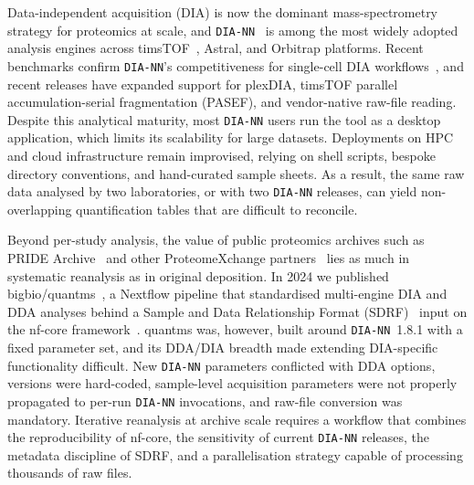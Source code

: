 Data-independent acquisition (DIA) is now the dominant mass-spectrometry strategy for proteomics at scale, and \texttt{DIA-NN}~\cite{demichev2020} is among the most widely adopted analysis engines across timsTOF~\cite{brunner2022,meier2020}, Astral, and Orbitrap platforms.
Recent benchmarks confirm \texttt{DIA-NN}'s competitiveness for single-cell DIA workflows~\cite{wang2025}, and recent releases have expanded support for plexDIA, timsTOF parallel accumulation-serial fragmentation (PASEF), and vendor-native raw-file reading.
Despite this analytical maturity, most \texttt{DIA-NN} users run the tool as a desktop application, which limits its scalability for large datasets. Deployments on HPC and cloud infrastructure remain improvised, relying on shell scripts, bespoke directory conventions, and hand-curated sample sheets. As a result, the same raw data analysed by two laboratories, or with two \texttt{DIA-NN} releases, can yield non-overlapping quantification tables that are difficult to reconcile.

Beyond per-study analysis, the value of public proteomics archives such as PRIDE Archive~\cite{perezriverol2025pride} and other ProteomeXchange partners~\cite{deutsch2026proteomexchange} lies as much in systematic reanalysis as in original deposition. In 2024 we published bigbio/quantms~\cite{dai2024quantms}, a Nextflow pipeline that standardised multi-engine DIA and DDA analyses behind a Sample and Data Relationship Format (SDRF)~\cite{dai2021sdrf} input on the nf-core framework~\cite{ewels2020nfcore}. quantms was, however, built around \texttt{DIA-NN}~1.8.1 with a fixed parameter set, and its DDA/DIA breadth made extending DIA-specific functionality difficult. New \texttt{DIA-NN} parameters conflicted with DDA options, versions were hard-coded, sample-level acquisition parameters were not properly propagated to per-run \texttt{DIA-NN} invocations, and raw-file conversion was mandatory. Iterative reanalysis at archive scale requires a workflow that combines the reproducibility of nf-core, the sensitivity of current \texttt{DIA-NN} releases, the metadata discipline of SDRF, and a parallelisation strategy capable of processing thousands of raw files.

